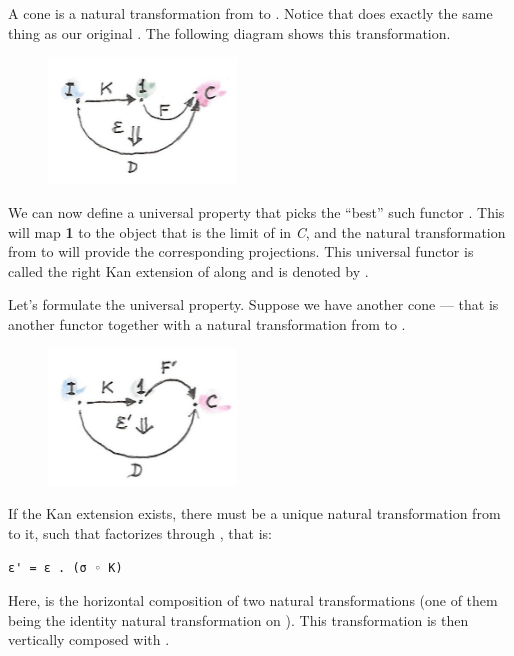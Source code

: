 \noindent
A cone is a natural transformation  from  to
. Notice that  does exactly the same thing as
our original . The following diagram shows this
transformation.

\begin{figure}[H]
\centering
\includegraphics[width=50mm]{images/kan3-e1492120491591.jpg}
\end{figure}

\noindent
We can now define a universal property that picks the ``best'' such
functor . This  will map \textbf{1} to the object
that is the limit of  in \emph{C}, and the natural
transformation  from  to  will
provide the corresponding projections. This universal functor is called
the right Kan extension of  along  and is denoted by
.

Let's formulate the universal property. Suppose we have another cone ---
that is another functor  together with a natural
transformation  from  to
.

\begin{figure}[H]
\centering
\includegraphics[width=50mm]{images/kan31-e1492120512209.jpg}
\end{figure}

\noindent
If the Kan extension  exists, there must be a unique
natural transformation  from  to it, such
that  factorizes through , that is:

\begin{verbatim}
ε' = ε . (σ ◦ K)
\end{verbatim}
Here,  is the horizontal composition of two natural
transformations (one of them being the identity natural transformation
on ). This transformation is then vertically composed with
.

